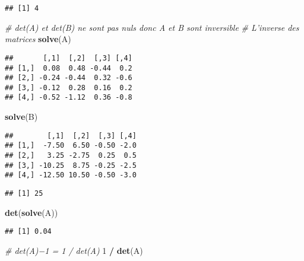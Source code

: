 \documentclass[]{article}
\newenvironment{Shaded}{\begin{snugshade}}{\end{snugshade}}
\newcommand{\CommentTok}[1]{\textcolor[rgb]{0.56,0.35,0.01}{\textit{#1}}}
\newcommand{\DecValTok}[1]{\textcolor[rgb]{0.00,0.00,0.81}{#1}}
\newcommand{\KeywordTok}[1]{\textcolor[rgb]{0.13,0.29,0.53}{\textbf{#1}}}
\newcommand{\NormalTok}[1]{#1}
\newcommand{\OperatorTok}[1]{\textcolor[rgb]{0.81,0.36,0.00}{\textbf{#1}}}
\newcommand{\StringTok}[1]{\textcolor[rgb]{0.31,0.60,0.02}{#1}}
\begin{document}
\begin{verbatim}
## [1] 4
\end{verbatim}

\begin{Shaded}
\begin{Highlighting}[]
\CommentTok{# det(A) et det(B) ne sont pas nuls donc A et B sont inversible}
\CommentTok{# L'inverse des matrices}
\KeywordTok{solve}\NormalTok{(A)}
\end{Highlighting}
\end{Shaded}

\begin{verbatim}
##       [,1]  [,2]  [,3] [,4]
## [1,]  0.08  0.48 -0.44  0.2
## [2,] -0.24 -0.44  0.32 -0.6
## [3,] -0.12  0.28  0.16  0.2
## [4,] -0.52 -1.12  0.36 -0.8
\end{verbatim}

\begin{Shaded}
\begin{Highlighting}[]
\KeywordTok{solve}\NormalTok{(B)}
\end{Highlighting}
\end{Shaded}

\begin{verbatim}
##        [,1]  [,2]  [,3] [,4]
## [1,]  -7.50  6.50 -0.50 -2.0
## [2,]   3.25 -2.75  0.25  0.5
## [3,] -10.25  8.75 -0.25 -2.5
## [4,] -12.50 10.50 -0.50 -3.0
\end{verbatim}

\begin{Shaded}
\end{Shaded}

\begin{verbatim}
## [1] 25
\end{verbatim}

\begin{Shaded}
\begin{Highlighting}[]
\KeywordTok{det}\NormalTok{(}\KeywordTok{solve}\NormalTok{(A))}
\end{Highlighting}
\end{Shaded}

\begin{verbatim}
## [1] 0.04
\end{verbatim}

\begin{Shaded}
\begin{Highlighting}[]
\CommentTok{# det(A)−1 = 1 / det(A)}
\DecValTok{1} \OperatorTok{/}\StringTok{ }\KeywordTok{det}\NormalTok{(A)}
\end{Highlighting}
\end{Shaded}
\end{document}
